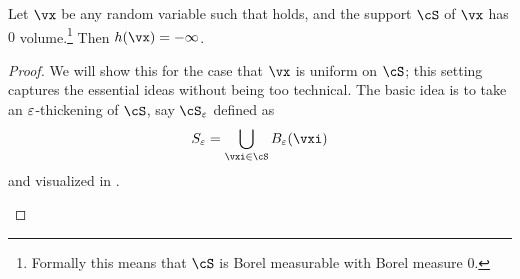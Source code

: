 \documentclass[../../book-main.tex]{subfiles}
\begin{document}
\begin{theorem}\label{thm:degenerate_entropy_negative_infinity}
    Let \(\vx\) be any random variable such that  holds, and the support \(\cS\) of \(\vx\) has \(0\) volume.\footnote{Formally this means that \(\cS\) is Borel measurable with Borel measure \(0\).} Then \(h(\vx) = -\infty\).
\end{theorem}
\begin{proof}
    We will show this for the case that \(\vx\) is uniform on \(\cS\); this setting captures the essential ideas without being too technical. The basic idea is to take an \(\varepsilon\)-thickening of \(\cS\), say \(\cS_{\eps}\) defined as 
    \begin{equation}
        S_{\eps} = \bigcup_{\vxi \in \cS}B_{\eps}(\vxi)
    \end{equation}
    and visualized in .
    \begin{figure}[th]
        \centering
\end{figure}
\end{proof}
\end{document}
